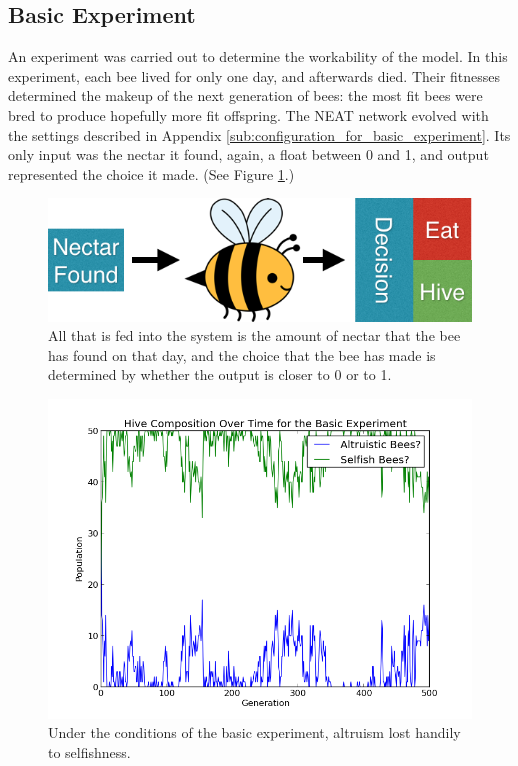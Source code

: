 \documentclass[11pt, letter]{article}
\begin{document}
		\subsection{Basic Experiment} %
		\label{sub:basic_experiment}
			An experiment was carried out to determine the workability of the model. In this experiment, each bee lived for only one day, and afterwards died. Their fitnesses determined the makeup of the next generation of bees: the most fit bees were bred to produce hopefully more fit offspring. The NEAT network evolved with the settings described in Appendix \ref{sub:configuration_for_basic_experiment}. Its only input was the nectar it found, again, a float between 0 and 1, and output represented the choice it made. (See Figure \ref{fig:naive_system}.)

			\begin{figure}[tbph!]
				\begin{center}
					\includegraphics[scale=.5]{bee_diagrams/naive_system.png}
				\end{center}
				\caption{All that is fed into the system is the amount of nectar that the bee has found on that day, and the choice that the bee has made is determined by whether the output is closer to 0 or to 1.}
				\label{fig:naive_system}
			\end{figure}

			\begin{figure}[tbpH!]
				\begin{center}
					\includegraphics[scale=.5]{results/basic_comp.png}
				\end{center}
				\caption{Under the conditions of the basic experiment, altruism lost handily to selfishness.}
				\label{fig:basic_experiment_composition}
			\end{figure}
\end{document}
